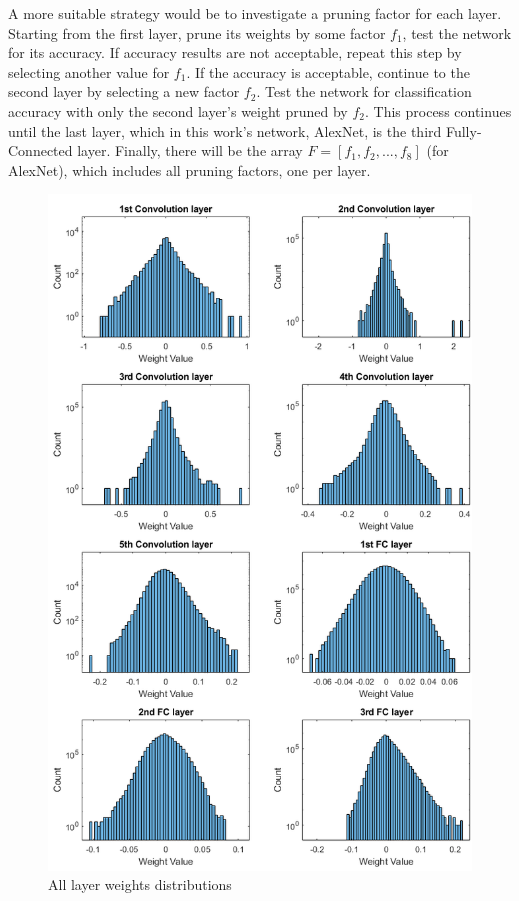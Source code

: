 A more suitable strategy would be to investigate a pruning factor for each layer. Starting from the first layer, prune its weights by some factor $f_1$, test the network for its accuracy. If accuracy results are not acceptable, repeat this step by selecting another value for $f_1$. If the accuracy is acceptable, continue to the second layer by selecting a new factor $f_2$. Test the network for classification accuracy with only the second layer's weight pruned by $f_2$. This process continues until the last layer, which in this work's network, AlexNet, is the third Fully-Connected layer. Finally, there will be the array $F = [f_1, f_2, ..., f_8]$ (for AlexNet), which includes all pruning factors, one per layer.

\begin{figure} [H]
	\centering
	\includegraphics[width=\textwidth]{Images/Weights-distributions/all-layer-original-weights-distributions.png}
	\decoRule
	\caption[All layer weights distributions]{All layer weights distributions}
	\label{fig:all-layer-original-weights-distributions}
\end{figure}

